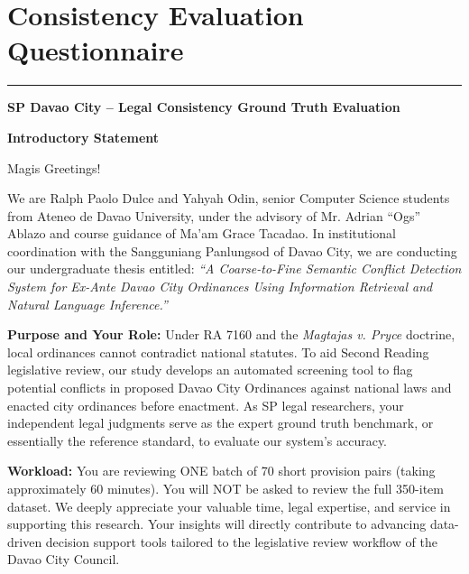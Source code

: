 \chapter[Evaluation Questionnaire]{Consistency Evaluation Questionnaire}
\label{app:usability_instruments}

\vspace{1em}
\hrule
\vspace{1em}

\begin{center}
    \textbf{\large SP Davao City -- Legal Consistency Ground Truth Evaluation}
\end{center}

\vspace{0.5em}
\noindent\textbf{Introductory Statement}

\noindent Magis Greetings!

\noindent We are Ralph Paolo Dulce and Yahyah Odin, senior Computer Science students from Ateneo de Davao University, under the advisory of Mr. Adrian ``Ogs'' Ablazo and course guidance of Ma'am Grace Tacadao. In institutional coordination with the Sangguniang Panlungsod of Davao City, we are conducting our undergraduate thesis entitled: \textit{``A Coarse-to-Fine Semantic Conflict Detection System for Ex-Ante Davao City Ordinances Using Information Retrieval and Natural Language Inference.''}

\vspace{0.5em}
\noindent\textbf{Purpose and Your Role:} Under RA 7160 and the \textit{Magtajas v. Pryce} doctrine, local ordinances cannot contradict national statutes. To aid Second Reading legislative review, our study develops an automated screening tool to flag potential conflicts in proposed Davao City Ordinances against national laws and enacted city ordinances before enactment. As SP legal researchers, your independent legal judgments serve as the expert ground truth benchmark, or essentially the reference standard, to evaluate our system's accuracy.

\vspace{0.5em}
\noindent\textbf{Workload:} You are reviewing ONE batch of 70 short provision pairs (taking approximately 60 minutes). You will NOT be asked to review the full 350-item dataset. We deeply appreciate your valuable time, legal expertise, and service in supporting this research. Your insights will directly contribute to advancing data-driven decision support tools tailored to the legislative review workflow of the Davao City Council.

